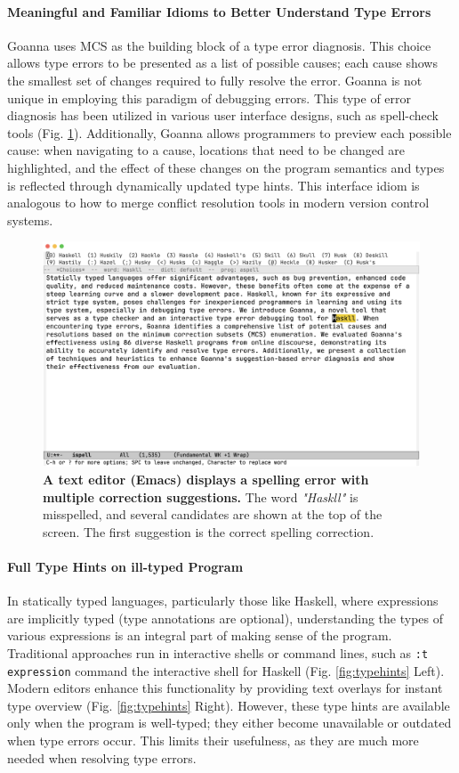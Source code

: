 \documentclass[pdflatex,lineno,sn-nature,Numbered]{sn-jnl}%
\begin{document}
\paragraph{Meaningful and Familiar Idioms to Better Understand Type Errors}

Goanna uses MCS as the building block of a type error diagnosis. This choice allows type errors to be presented as a list of possible causes; each cause shows the smallest set of changes required to fully resolve the error. Goanna is not unique in employing this paradigm of debugging errors. This type of error diagnosis has been utilized in various user interface designs, such as spell-check tools (Fig. \ref{fig:ispell}). Additionally, Goanna allows programmers to preview each possible cause: when navigating to a cause, locations that need to be changed are highlighted, and the effect of these changes on the program semantics and types is reflected through dynamically updated type hints. This interface idiom is analogous to how to merge conflict resolution tools in modern version control systems.

\begin{figure}[hbt]
  \centering
  \includegraphics[width=0.8\linewidth]{images/ispell}
  \caption{{\bf A text editor (Emacs) displays a spelling error with multiple correction suggestions.} The word {\it "Haskll"} is misspelled, and several candidates are shown at the top of the screen. The first suggestion is the correct spelling correction.}
  \label{fig:ispell}
\end{figure}

\paragraph{Full Type Hints on ill-typed Program}

In statically typed languages, particularly those like Haskell, where expressions are implicitly typed (type annotations are optional), understanding the types of various expressions is an integral part of making sense of the program. Traditional approaches run in interactive shells or command lines, such as \texttt{:t expression} command the interactive shell for Haskell (Fig. \ref{fig:typehints} Left). Modern editors enhance this functionality by providing text overlays for instant type overview (Fig. \ref{fig:typehints} Right). However, these type hints are available only when the program is well-typed; they either become unavailable or outdated when type errors occur. This limits their usefulness, as they are much more needed when resolving type errors.
\end{document}
